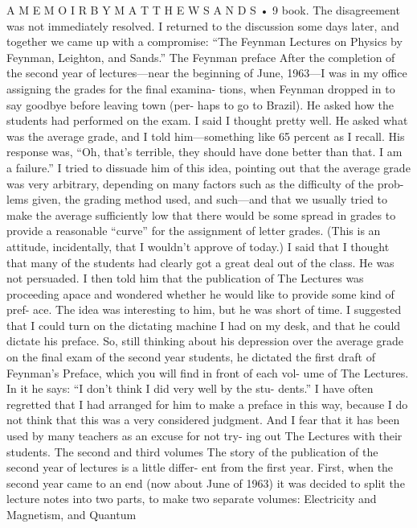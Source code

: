 \documentclass[11pt,oneside]{article}
\begin{document}
A  M E M O I R  B Y  M A T T H E W  S A N D S • 9 book. The disagreement was not immediately resolved. I returned to the discussion some days later, and together we came up with a compromise: “The Feynman Lectures on Physics by Feynman, Leighton, and Sands.” The Feynman preface After the completion of the second year of lectures---near the beginning of June, 1963---I was in my office assigning the grades for the final examina- tions, when Feynman dropped in to say goodbye before leaving town (per- haps to go to Brazil). He asked how the students had performed on the exam. I said I thought pretty well. He asked what was the average grade, and I told him---something like 65 percent as I recall. His response was, “Oh, that’s terrible, they should have done better than that. I am a failure.” I tried to dissuade him of this idea, pointing out that the average grade was very arbitrary, depending on many factors such as the difficulty of the prob- lems given, the grading method used, and such---and that we usually tried to make the average sufficiently low that there would be some spread in grades to provide a reasonable “curve” for the assignment of letter grades. (This is an attitude, incidentally, that I wouldn’t approve of today.) I said that I thought that many of the students had clearly got a great deal out of the class. He was not persuaded. I then told him that the publication of The Lectures was proceeding apace and wondered whether he would like to provide some kind of pref- ace. The idea was interesting to him, but he was short of time. I suggested that I could turn on the dictating machine I had on my desk, and that he could dictate his preface. So, still thinking about his depression over the average grade on the final exam of the second year students, he dictated the first draft of Feynman’s Preface, which you will find in front of each vol- ume of The Lectures. In it he says: “I don’t think I did very well by the stu- dents.” I have often regretted that I had arranged for him to make a preface in this way, because I do not think that this was a very considered judgment. And I fear that it has been used by many teachers as an excuse for not try- ing out The Lectures with their students. The second and third volumes The story of the publication of the second year of lectures is a little differ- ent from the first year. First, when the second year came to an end (now about June of 1963) it was decided to split the lecture notes into two parts, to make two separate volumes: Electricity and Magnetism, and Quantum\par
\end{document}
